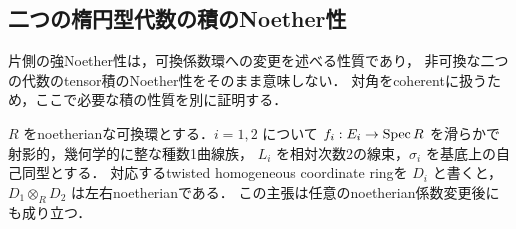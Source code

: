 \subsection{二つの楕円型代数の積のNoether性}

片側の強Noether性は，可換係数環への変更を述べる性質であり，
非可換な二つの代数のtensor積のNoether性をそのまま意味しない．
対角をcoherentに扱うため，ここで必要な積の性質を別に証明する．

\begin{lemma}\label{lem:elliptic-bisection-noetherian}
$R$ をnoetherianな可換環とする．$i=1,2$ について
$f_i:E_i\to\operatorname{Spec} R$ を滑らかで射影的，幾何学的に整な種数1曲線族，
$L_i$ を相対次数2の線束，$\sigma_i$ を基底上の自己同型とする．
対応するtwisted homogeneous coordinate ringを $D_i$ と書くと，
$D_1\otimes_R D_2$ は左右noetherianである．
この主張は任意のnoetherian係数変更後にも成り立つ．
\end{lemma}
